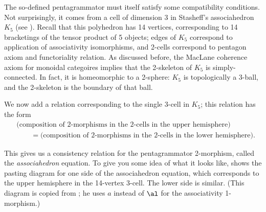 The so-defined pentagrammator must itself satisfy some compatibility
conditions. Not surprisingly, it comes from a cell of dimension 3 in Stasheff's
associahedron $K_5$ (see ). Recall that  this polyhedron has
14 vertices, corresponding to 14 bracketings of the tensor product of 5
objects; edges of $K_5$  correspond to application of associativity
isomorphisms, and 2-cells correspond to  pentagon axiom and functoriality
relation. As discussed before, the MacLane coherence axiom for monoidal
categoires implies that the 2-skeleton of $K_5$ is simply-connected.  In fact,
it is homeomorphic to a 2-sphere: $K_5$ is topologically a 3-ball, and the
2-skeleton is the boundary of that ball.

We now add a relation corresponding to the single 3-cell in $K_5$;
this relation has the form
\begin{align*}
  &\text{(composition
  of 2-morphisms in the 2-cells in the upper hemisphere)}\\
  & \qquad =
  \text{(composition of 2-morphisms in the 2-cells in the lower hemisphere)}.
\end{align*}

This gives us a consistency relation for the pentagrammator 2-morphism, called
the \emph{associahedron} equation. To give you some idea of what it looks like,
 shows the pasting diagram for one side of the
associahedron equation, which corresponds to the upper hemisphere in the
14-vertex 3-cell. The lower side is similar. (This diagram is copied from
\cite[Appendix C]{schommer-pries}; he uses $a$ instead of $\al$ for the
associativity 1-morphism.)

